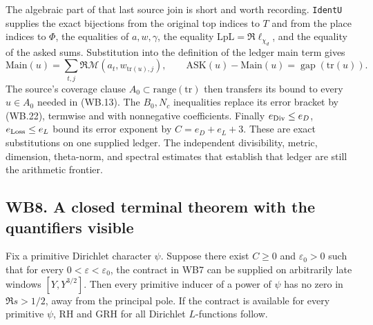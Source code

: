 The algebraic part of that last source join is short and worth
recording. \texttt{IdentU} supplies the exact bijections from the
original top indices to $T$ and from the place indices to $\Phi$,
the equalities of $a,w,\gamma$, the equality
$\mathrm{LpL}=\Re\ell_{\chi_d}$, and the equality of the asked
sums. Substitution into the definition of the ledger main term gives
\[
 \mathrm{Main}(u)=\sum_{t,j}\Re\mathcal M(a_t,w_{\mathrm{tr}(u),j}),
 \qquad
 \mathrm{ASK}(u)-\mathrm{Main}(u)
    =\operatorname{gap}(\mathrm{tr}(u)).
 \tag{WB.26}
\]
The source's coverage clause $A_0\subset\mathrm{range}(\mathrm{tr})$
then transfers its bound to every $u\in A_0$ needed in (WB.13).
The $B_0,N_c$ inequalities replace its error bracket by (WB.22),
termwise and with nonnegative coefficients. Finally
$e_{\rm Div}\le e_D$, $e_{\rm Loss}\le e_L$ bound its error
exponent by $C=e_D+e_L+3$. These are exact substitutions on one
supplied ledger. The independent divisibility, metric, dimension,
theta-norm, and spectral estimates that establish that ledger are
still the arithmetic frontier.

\subsection{WB8. A closed terminal theorem with the quantifiers visible}

\begin{theorem}
Fix a primitive Dirichlet character $\psi$. Suppose there exist
$C\ge0$ and $\varepsilon_0>0$ such that for every
$0<\varepsilon<\varepsilon_0$, the contract in WB7 can be supplied
on arbitrarily late windows $[Y,Y^{3/2}]$. Then every primitive
inducer of a power of $\psi$ has no zero in $\Re s>1/2$,
away from the principal pole. If the contract is available for every
primitive $\psi$, RH and GRH for all Dirichlet $L$-functions follow.
\end{theorem}

